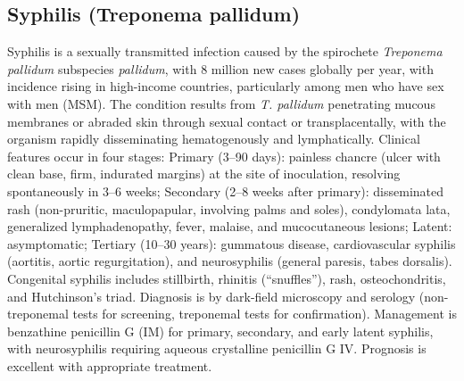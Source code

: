\subsection{Syphilis (Treponema pallidum)}
\label{sec:Syphilis}
Syphilis is a sexually transmitted infection caused by the spirochete \textit{Treponema pallidum} subspecies \textit{pallidum}, with 8 million new cases globally per year, with incidence rising in high-income countries, particularly among men who have sex with men (MSM). The condition results from \textit{T. pallidum} penetrating mucous membranes or abraded skin through sexual contact or transplacentally, with the organism rapidly disseminating hematogenously and lymphatically. Clinical features occur in four stages: Primary (3--90 days): painless chancre (ulcer with clean base, firm, indurated margins) at the site of inoculation, resolving spontaneously in 3--6 weeks; Secondary (2--8 weeks after primary): disseminated rash (non-pruritic, maculopapular, involving palms and soles), condylomata lata, generalized lymphadenopathy, fever, malaise, and mucocutaneous lesions; Latent: asymptomatic; Tertiary (10--30 years): gummatous disease, cardiovascular syphilis (aortitis, aortic regurgitation), and neurosyphilis (general paresis, tabes dorsalis). Congenital syphilis includes stillbirth, rhinitis (``snuffles''), rash, osteochondritis, and Hutchinson's triad. Diagnosis is by dark-field microscopy and serology (non-treponemal tests for screening, treponemal tests for confirmation). Management is benzathine penicillin G (IM) for primary, secondary, and early latent syphilis, with neurosyphilis requiring aqueous crystalline penicillin G IV. Prognosis is excellent with appropriate treatment.

